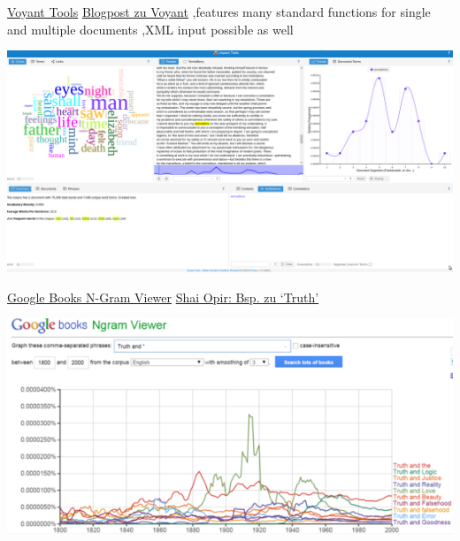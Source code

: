 \documentclass[10pt]{beamer}
\begin{document}
\begin{frame}{\href{https://voyant-tools.org/}{Voyant Tools}}
\href{https://blogs.reed.edu/ed-tech/2017/03/text-analysis-using-voyant-tools/}{Blogpost zu Voyant} \sep features many standard functions for single and multiple documents \sep XML input possible as well

\includegraphics[width=\textwidth]{voyant.png}
\end{frame}



\begin{frame}{\href{https://books.google.com/ngrams}{Google Books N-Gram Viewer}}
\href{https://firstmonday.org/ojs/index.php/fm/article/view/5567/5535}{Shai Opir: Bsp. zu `Truth'}

\includegraphics[width=\textwidth]{googlengramstruth.png}
\end{frame}
\end{document}
